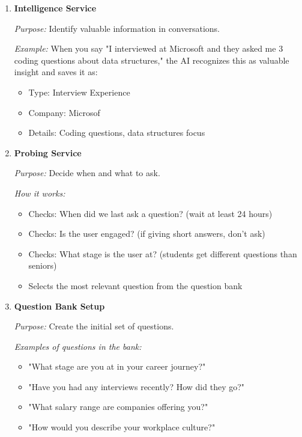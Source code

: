 \documentclass[12pt,a4paper]{article}
\begin{document}
\begin{enumerate}
  \item \textbf{Intelligence Service }

  \textit{Purpose:} Identify valuable information in conversations.

  \textit{Example:} When you say "I interviewed at Microsoft and they asked me 3 coding questions about data structures," the AI recognizes this as valuable insight and saves it as:
  \begin{itemize}
    \item Type: Interview Experience
    \item Company: Microsof
    \item Details: Coding questions, data structures focus
  \end{itemize}

  \item \textbf{Probing Service }

  \textit{Purpose:} Decide when and what to ask.

  \textit{How it works:}
  \begin{itemize}
    \item Checks: When did we last ask a question? (wait at least 24 hours)
    \item Checks: Is the user engaged? (if giving short answers, don't ask)
    \item Checks: What stage is the user at? (students get different questions than seniors)
    \item Selects the most relevant question from the question bank
  \end{itemize}

  \item \textbf{Question Bank Setup }

  \textit{Purpose:} Create the initial set of questions.

  \textit{Examples of questions in the bank:}
  \begin{itemize}
    \item "What stage are you at in your career journey?"
    \item "Have you had any interviews recently? How did they go?"
    \item "What salary range are companies offering you?"
    \item "How would you describe your workplace culture?"
  \end{itemize}
\end{enumerate}
\end{document}
